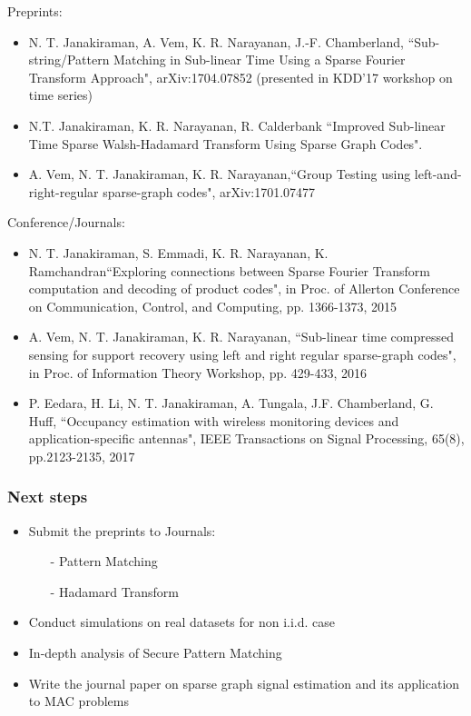 \documentclass[10pt,xcolor=table]{beamer}
\begin{document}
\begin{frame}%
Preprints:
{\footnotesize 
	\begin{itemize}
		\item N. T. Janakiraman, A. Vem, K. R. Narayanan, J.-F. Chamberland, {\blue``Sub-string/Pattern Matching in Sub-linear Time Using a Sparse Fourier Transform Approach",} arXiv:1704.07852 (presented in KDD'17 workshop on time series)
		\item N.T. Janakiraman, K. R. Narayanan, R. Calderbank {\blue``Improved Sub-linear Time Sparse Walsh-Hadamard Transform Using Sparse Graph Codes"}.
		\item A. Vem, N. T. Janakiraman, K. R. Narayanan,{\blue ``Group Testing using left-and-right-regular sparse-graph codes",} arXiv:1701.07477
		
	\end{itemize}
}

Conference/Journals:
{\footnotesize 
	\begin{itemize}
		\item N. T. Janakiraman, S. Emmadi, K. R. Narayanan, K. Ramchandran{\blue ``Exploring connections between Sparse Fourier Transform computation and decoding of product codes",} in Proc. of Allerton Conference on Communication, Control, and Computing, pp. 1366-1373, 2015
		\item A. Vem, N. T. Janakiraman, K. R. Narayanan, {\blue ``Sub-linear time compressed sensing for support recovery using left and right regular sparse-graph codes",} in Proc. of Information Theory Workshop, pp. 429-433, 2016
		\item P. Eedara, H. Li, N. T. Janakiraman, A. Tungala, J.F. Chamberland, G. Huff, {\blue ``Occupancy estimation with wireless monitoring devices and application-specific antennas",} IEEE Transactions on Signal Processing, 65(8), pp.2123-2135, 2017
		
		
	\end{itemize}
}
\end{frame}


\begin{frame}\frametitle{Next steps}
\begin{itemize}\itemsep10pt
\item Submit the preprints to Journals:
\begin{itemize}
	\item[-]  Pattern Matching
	\item[-]  Hadamard Transform
\end{itemize}
\item Conduct simulations on real datasets for non i.i.d. case
\item In-depth analysis of Secure Pattern Matching
\item Write the
journal paper on sparse graph signal estimation and its application to MAC problems
\end{itemize}
\end{frame}
\end{document}
